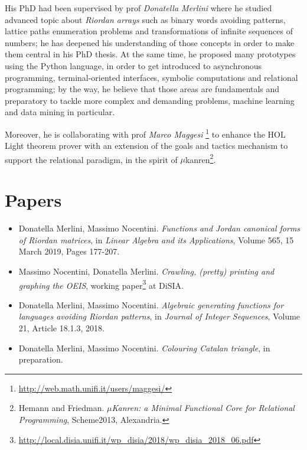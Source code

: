 \documentclass[a4paper]{article} %
\begin{document}
    His PhD had been supervised by prof \textit{Donatella Merlini} where he
    studied advanced topic about \textit{Riordan arrays} such as binary words
    avoiding patterns, lattice paths enumeration problems and transformations
    of infinite sequences of numbers; he has deepened his understanding of
    those concepts in order to make them central in his PhD thesis. At the same
    time, he proposed many prototypes using the Python language, in order to
    get introduced to asynchronous programming, terminal-oriented interfaces,
    symbolic computations and relational programming; by the way, he believe
    that those areas are fundamentals and preparatory to tackle more complex
    and demanding problems, machine learning and data mining in particular.

    Moreover, he is collaborating with prof \textit{Marco Maggesi}
    \footnote{\url{http://web.math.unifi.it/users/maggesi/}} to enhance the HOL
    Light theorem prover with an extension of the goals and tactics mechanism
    to support the relational paradigm, in the spirit of
    $\mu$kanren\footnote{Hemann and Friedman. \textit{$\mu$Kanren: a Minimal Functional
    Core for Relational Programming}, Scheme2013, Alexandria.}.

    \section{Papers}

    \begin{itemize}

        \item Donatella Merlini, Massimo Nocentini. \emph{Functions and Jordan canonical forms of Riordan matrices},
        in \textit{Linear Algebra and its Applications}, Volume 565, 15 March 2019, Pages 177-207.

        \item Massimo Nocentini, Donatella Merlini. \emph{Crawling, (pretty) printing and graphing the OEIS}, 
        working paper\footnote{\url{http://local.disia.unifi.it/wp_disia/2018/wp_disia_2018_06.pdf}} at DiSIA.

        \item Donatella Merlini, Massimo Nocentini. \emph{Algebraic generating functions for languages
            avoiding Riordan patterns}, in \textit{Journal of Integer Sequences}, Volume 21, Article 18.1.3, 2018.

        \item Donatella Merlini, Massimo Nocentini. \emph{Colouring Catalan triangle}, in preparation.

    \end{itemize}
    
\end{document}
